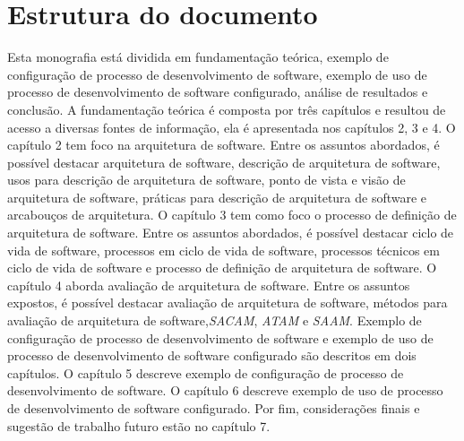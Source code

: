 \section{Estrutura do documento}

Esta monografia está dividida em fundamentação teórica, exemplo de configuração de processo de desenvolvimento de software, exemplo de uso de processo de desenvolvimento de software configurado, análise de resultados e conclusão. A fundamentação teórica é composta por três capítulos e resultou de acesso a diversas fontes de informação, ela é apresentada nos capítulos 2, 3 e 4. O capítulo 2 tem foco na arquitetura de software. Entre os assuntos abordados, é possível destacar arquitetura de software, descrição de arquitetura de software, usos para descrição de arquitetura de software, ponto de vista e visão de arquitetura de software, práticas para descrição de arquitetura de software e arcabouços de arquitetura. 
O capítulo 3 tem como foco o processo de definição de arquitetura de software. Entre os assuntos abordados, é possível destacar ciclo de vida de software, processos em ciclo de vida de software, processos técnicos em ciclo de vida de software e processo de definição de arquitetura de software. 
O capítulo 4 aborda avaliação de arquitetura de software. Entre os assuntos expostos, é possível destacar avaliação de arquitetura de software, métodos para avaliação de arquitetura de software,\emph{\acrfull{SACAM}}, \emph{\acrfull{ATAM}} e \emph{\acrfull{SAAM}}. Exemplo de configuração de processo de desenvolvimento de software e exemplo de uso de processo de desenvolvimento de software configurado são descritos em dois capítulos. O capítulo 5 descreve exemplo de configuração de processo de desenvolvimento de software. O capítulo 6 descreve exemplo de uso de processo de desenvolvimento de software configurado. Por fim, considerações finais e sugestão de trabalho futuro estão no capítulo 7.
